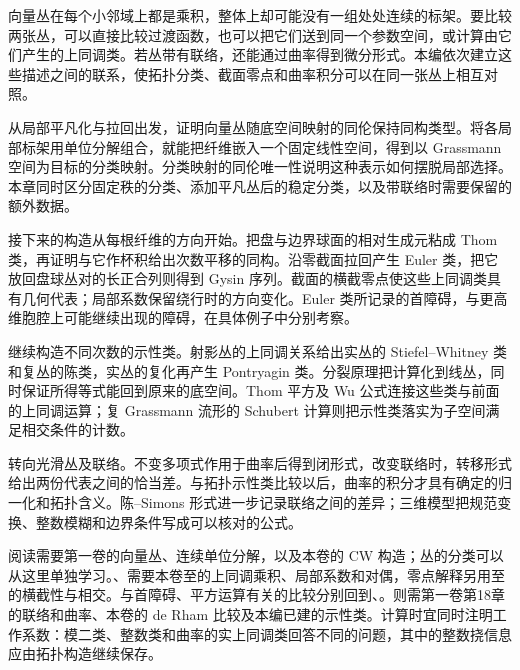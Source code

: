
% 

\BookPartGuide
向量丛在每个小邻域上都是乘积，整体上却可能没有一组处处连续的标架。要比较两张丛，可以直接比较过渡函数，也可以把它们送到同一个参数空间，或计算由它们产生的上同调类。若丛带有联络，还能通过曲率得到微分形式。本编依次建立这些描述之间的联系，使拓扑分类、截面零点和曲率积分可以在同一张丛上相互对照。

\ProseParagraphBreak

从局部平凡化与拉回出发，证明向量丛随底空间映射的同伦保持同构类型。将各局部标架用单位分解组合，就能把纤维嵌入一个固定线性空间，得到以 Grassmann 空间为目标的分类映射。分类映射的同伦唯一性说明这种表示如何摆脱局部选择。本章同时区分固定秩的分类、添加平凡丛后的稳定分类，以及带联络时需要保留的额外数据。

\ProseParagraphBreak

接下来的构造从每根纤维的方向开始。把盘与边界球面的相对生成元粘成 Thom 类，再证明与它作杯积给出次数平移的同构。沿零截面拉回产生 Euler 类，把它放回盘球丛对的长正合列则得到 Gysin 序列。截面的横截零点使这些上同调类具有几何代表；局部系数保留绕行时的方向变化。Euler 类所记录的首障碍，与更高维胞腔上可能继续出现的障碍，在具体例子中分别考察。

\ProseParagraphBreak

继续构造不同次数的示性类。射影丛的上同调关系给出实丛的 Stiefel--Whitney 类和复丛的陈类，实丛的复化再产生 Pontryagin 类。分裂原理把计算化到线丛，同时保证所得等式能回到原来的底空间。Thom 平方及 Wu 公式连接这些类与前面的上同调运算；复 Grassmann 流形的 Schubert 计算则把示性类落实为子空间满足相交条件的计数。

\ProseParagraphBreak

转向光滑丛及联络。不变多项式作用于曲率后得到闭形式，改变联络时，转移形式给出两份代表之间的恰当差。与拓扑示性类比较以后，曲率的积分才具有确定的归一化和拓扑含义。陈--Simons 形式进一步记录联络之间的差异；三维模型把规范变换、整数模糊和边界条件写成可以核对的公式。

\ProseParagraphBreak

阅读需要第一卷的向量丛、连续单位分解，以及本卷的 CW 构造；丛的分类可以从这里单独学习。、需要本卷至的上同调乘积、局部系数和对偶，零点解释另用至的横截性与相交。与首障碍、平方运算有关的比较分别回到、。则需第一卷第18章的联络和曲率、本卷的 de Rham 比较及本编已建的示性类。计算时宜同时注明工作系数：模二类、整数类和曲率的实上同调类回答不同的问题，其中的整数挠信息应由拓扑构造继续保存。





